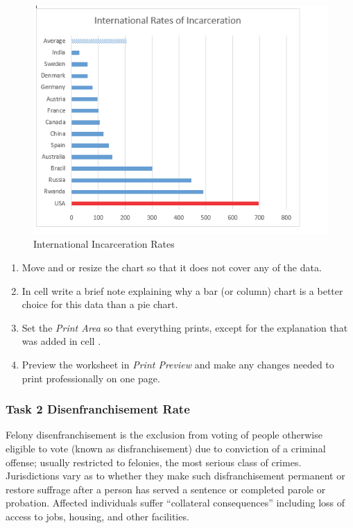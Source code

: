\begin{figure}[H]
	\centering
	\includegraphics[width=\maxwidth{.95\linewidth}]{gfx/ch04_fig56}
	\caption{International Incarceration Rates}
	\label{04:fig56}
\end{figure}

\begin{enumerate}
	\item Move and or resize the chart so that it does not cover any of the data.
	\item In cell  write a brief note explaining why a bar (or column) chart is a better choice for this data than a pie chart.
	\item Set the \textit{Print Area} so that everything prints, except for the explanation that was added in cell .
	\item Preview the  worksheet in \textit{Print Preview} and make any changes needed to print professionally on one page.
\end{enumerate}

\subsubsection{Task 2 Disenfranchisement Rate}

Felony disenfranchisement is the exclusion from voting of people otherwise eligible to vote (known as disfranchisement) due to conviction of a criminal offense; usually restricted to felonies, the most serious class of crimes. Jurisdictions vary as to whether they make such disfranchisement permanent or restore suffrage after a person has served a sentence or completed parole or probation. Affected individuals suffer ``collateral consequences'' including loss of access to jobs, housing, and other facilities.

